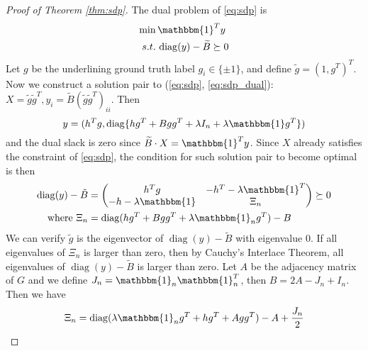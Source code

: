 \documentclass[conference]{IEEEtran}
\DeclareMathOperator{\diag}{diag}
\begin{document}
	\begin{proof}[Proof of Theorem \ref{thm:sdp}]
		The dual problem of \eqref{eq:sdp} is
		\begin{align}
		\min\, & \mathbbm{1}^T y \notag \\
		s.t.\,& \diag(y) - \widetilde{B} \succeq 0
		\label{eq:sdp_dual}
		\end{align}
Let $g$ be the underlining ground truth label $g_i \in \{\pm 1\}$, and
define $\tilde{g} = (1,g^T)^T$.
Now we construct a solution pair to (\ref{eq:sdp}, \ref{eq:sdp_dual}): $X=\tilde{g}\tilde{g}^T, y_i = \tilde{B}(\tilde{g}\tilde{g}^T)_{ii}$.
Then $$
y = (h^T g, \diag\{hg^T+Bgg^T + \lambda I_n + \lambda \mathbbm{1}g^T\})
$$
and the dual slack is zero since $\widetilde{B} \cdot X = \mathbbm{1}^T y $.
Since $X$ already satisfies the constraint of \eqref{eq:sdp}, the condition for such solution pair to become optimal is then
\begin{align}
\diag(y) - \tilde{B} & = \begin{pmatrix} h^T g & -h^T - \lambda \mathbbm{1}^T \\ -h- \lambda \mathbbm{1} & \Xi_n \end{pmatrix}
\succeq 0 \notag \\
\textrm{ where }\Xi_n & = \diag(hg^T + Bgg^T + \lambda \mathbbm{1}_ng^T) - B
\end{align}
		We can verify $\tilde{g}$ is the eigenvector of $\diag(y) - \tilde{B}$ with eigenvalue $0$.
		If all eigenvalues of $\Xi_n$ is larger than zero, then by
		Cauchy’s Interlace Theorem, all eigenvalues of $\diag(y) - \tilde{B}$ is larger than zero.
		Let $A$ be the adjacency matrix of $G$
		and we define $J_n = \mathbbm{1}_n \mathbbm{1}_n^T $, then $B=2A-J_n+I_n$.
		Then we have
		\begin{equation}\label{eq:Xi_n}
		\Xi_n = \diag(\lambda \mathbbm{1}_n g^T + hg^T + Agg^T) - A + \frac{J_n}{2}
		\end{equation}
		

\end{proof}
\end{document}
